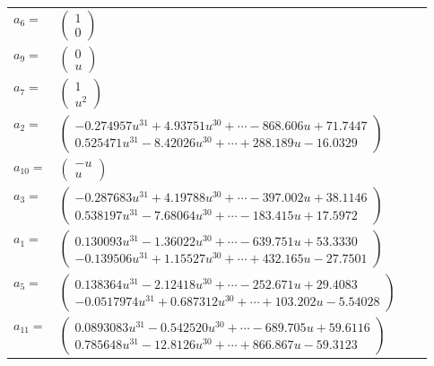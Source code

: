 \documentclass[1p]{elsarticle_modified}
\theoremstyle{definition}
\begin{document}
\begin{tabular}{m{7pt} m{180pt} m{7pt} m{180pt} }
\flushright $a_{6}=$&$\begin{pmatrix}1\\0\end{pmatrix}$ \\
\flushright $a_{9}=$&$\begin{pmatrix}0\\u\end{pmatrix}$ \\
\flushright $a_{7}=$&$\begin{pmatrix}1\\u^2\end{pmatrix}$ \\
\flushright $a_{2}=$&$\begin{pmatrix}-0.274957 u^{31}+4.93751 u^{30}+\cdots-868.606 u+71.7447\\0.525471 u^{31}-8.42026 u^{30}+\cdots+288.189 u-16.0329\end{pmatrix}$ \\
\flushright $a_{10}=$&$\begin{pmatrix}- u\\u\end{pmatrix}$ \\
\flushright $a_{3}=$&$\begin{pmatrix}-0.287683 u^{31}+4.19788 u^{30}+\cdots-397.002 u+38.1146\\0.538197 u^{31}-7.68064 u^{30}+\cdots-183.415 u+17.5972\end{pmatrix}$ \\
\flushright $a_{1}=$&$\begin{pmatrix}0.130093 u^{31}-1.36022 u^{30}+\cdots-639.751 u+53.3330\\-0.139506 u^{31}+1.15527 u^{30}+\cdots+432.165 u-27.7501\end{pmatrix}$ \\
\flushright $a_{5}=$&$\begin{pmatrix}0.138364 u^{31}-2.12418 u^{30}+\cdots-252.671 u+29.4083\\-0.0517974 u^{31}+0.687312 u^{30}+\cdots+103.202 u-5.54028\end{pmatrix}$ \\
\flushright $a_{11}=$&$\begin{pmatrix}0.0893083 u^{31}-0.542520 u^{30}+\cdots-689.705 u+59.6116\\0.785648 u^{31}-12.8126 u^{30}+\cdots+866.867 u-59.3123\end{pmatrix}$ \\

\end{tabular}
\end{document}

